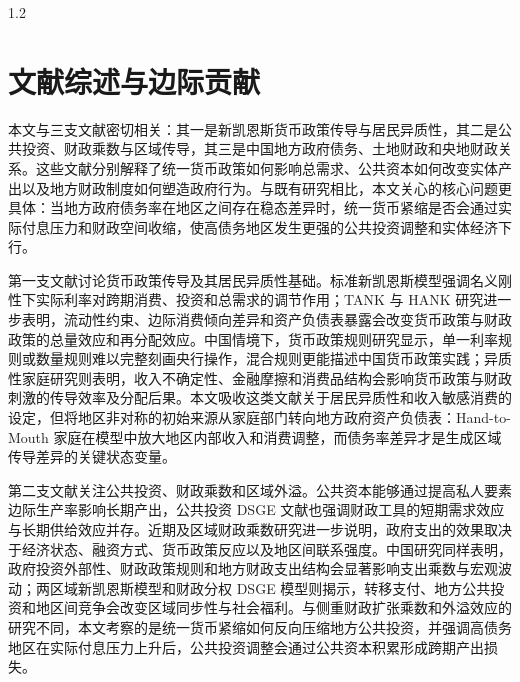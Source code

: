 \documentclass[12pt,UTF8]{ctexart}
\begin{document}
\begin{spacing}{1.2}
		\section{文献综述与边际贡献}
		
		本文与三支文献密切相关：其一是新凯恩斯货币政策传导与居民异质性，其二是公共投资、财政乘数与区域传导，其三是中国地方政府债务、土地财政和央地财政关系。这些文献分别解释了统一货币政策如何影响总需求、公共资本如何改变实体产出以及地方财政制度如何塑造政府行为。与既有研究相比，本文关心的核心问题更具体：当地方政府债务率在地区之间存在稳态差异时，统一货币紧缩是否会通过实际付息压力和财政空间收缩，使高债务地区发生更强的公共投资调整和实体经济下行。
		
		第一支文献讨论货币政策传导及其居民异质性基础。标准新凯恩斯模型强调名义刚性下实际利率对跨期消费、投资和总需求的调节作用\cite{gali2015}；TANK 与 HANK 研究进一步表明，流动性约束、边际消费倾向差异和资产负债表暴露会改变货币政策与财政政策的总量效应和再分配效应\cite{gali2007,kaplan2018,auclert2019,bilbiie2025}。中国情境下，货币政策规则研究显示，单一利率规则或数量规则难以完整刻画央行操作，混合规则更能描述中国货币政策实践\cite{wangxi2017}；异质性家庭研究则表明，收入不确定性、金融摩擦和消费品结构会影响货币政策与财政刺激的传导效率及分配后果\cite{xu2019uncertainty,wangxi2024,zhou2025}。本文吸收这类文献关于居民异质性和收入敏感消费的设定，但将地区非对称的初始来源从家庭部门转向地方政府资产负债表：Hand-to-Mouth 家庭在模型中放大地区内部收入和消费调整，而债务率差异才是生成区域传导差异的关键状态变量。
		
		第二支文献关注公共投资、财政乘数和区域外溢。公共资本能够通过提高私人要素边际生产率影响长期产出，公共投资 DSGE 文献也强调财政工具的短期需求效应与长期供给效应并存\cite{baxter1993,leeper2010}。近期及区域财政乘数研究进一步说明，政府支出的效果取决于经济状态、融资方式、货币政策反应以及地区间联系强度\cite{farhi2016,ramey2018,nakamura2014,chodorowreich2019,auerbach2020}。中国研究同样表明，政府投资外部性、财政政策规则和地方财政支出结构会显著影响支出乘数与宏观波动\cite{wangtian2014,ma2019,liulei2025}；两区域新凯恩斯模型和财政分权 DSGE 模型则揭示，转移支付、地方公共投资和地区间竞争会改变区域同步性与社会福利\cite{xing2015,zhu2018,wangwenfu2020}。与侧重财政扩张乘数和外溢效应的研究不同，本文考察的是统一货币紧缩如何反向压缩地方公共投资，并强调高债务地区在实际付息压力上升后，公共投资调整会通过公共资本积累形成跨期产出损失。
		

\end{spacing}
\end{document}
